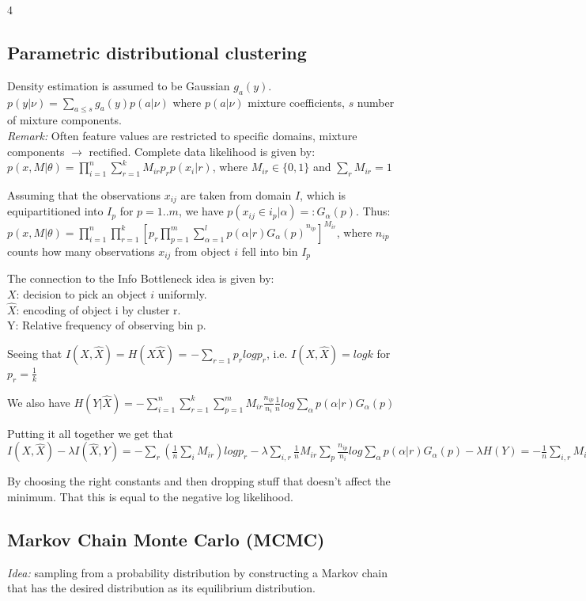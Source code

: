 \documentclass[9pt,parskip]{scrartcl}
\begin{document}
\begin{multicols*}{4}
\subsection*{Parametric distributional clustering}
Density estimation is assumed to be Gaussian $g_a(y)$. \\
$p(y| \nu) = \sum_{a \leq s} g_a(y) p(a|\nu)$ where $p(a|\nu)$ mixture coefficients, $s$ number of mixture components.\\
\textit{Remark:} Often feature values are restricted to specific domains, mixture components $\to$ rectified.
Complete data likelihood is given by: $p(x,M|\theta) = \prod_{i=1}^n \sum_{r=1}^k M_{ir}p_rp(x_i|r)$, where $M_{ir} \in \{0,1\}$ and $\sum_r M_{ir} = 1$

Assuming that the observations $x_{ij}$ are taken from domain $I$, which is equipartitioned into $I_p$ for $p= 1..m$, we have $p(x_{ij} \in i_p|\alpha) =: G_{\alpha}(p)$.
Thus:
$p(x,M|\theta) = \prod_{i=1}^n \prod_{r=1}^k[p_r \prod_{p=1}^m {\sum_{\alpha = 1}^l p(\alpha | r)G_{\alpha }(p)}^{n_{ip}}]^{M_{ir}}$,
where $n_{ip}$ counts how many observations $x_{ij}$ from object $i$ fell into bin $I_p$

The connection to the Info Bottleneck idea is given by:\\
$X$: decision to pick an object $i$ uniformly.\\
$\hat X$: encoding of object i by cluster r. \\
Y: Relative frequency of observing bin p.

Seeing that $I(X,\hat X) = H(X\hat X)$ = $-\sum_{r=1} p_r log p_r$, i.e. $I(X,\hat X) = log k$ for $p_r = \frac{1}{k}$

We also have $H(Y|\hat X) = - \sum_{i=1}^n \sum_{r=1}^k \sum_{p=1}^m M_{ir} \frac{n_{ip}}{n_i}\frac{1}{n} log \sum_{\alpha} p(\alpha|r)G_{\alpha}(p)$

Putting it all together we get that $I(X,\hat X) - \lambda I(\hat X, Y) = - \sum_r (\frac{1}{n}\sum_i M_{ir}) log p_r - \lambda \sum_{i,r} \frac{1}{n} M_{ir} \sum_p \frac{n_{ip}}{n_i}log \sum_{\alpha} p(\alpha|r)G_{\alpha}(p) - \lambda H(Y)
= - \frac{1}{n} \sum_{i,r} M_{ir}[log p_r + \frac{\lambda}{n_i} \sum_p n_{ip} log \sum_{\alpha} p(\alpha|r)G_{\alpha}(p)] - \lambda H(Y)$

By choosing the right constants and then dropping stuff that doesn't affect the minimum. That this is equal to the negative log likelihood. 

\subsection*{Markov Chain Monte Carlo (MCMC)}
\textit{Idea:} sampling from a probability distribution by constructing a Markov chain that has the desired distribution as its equilibrium distribution. 


\end{multicols*}
\end{document}
